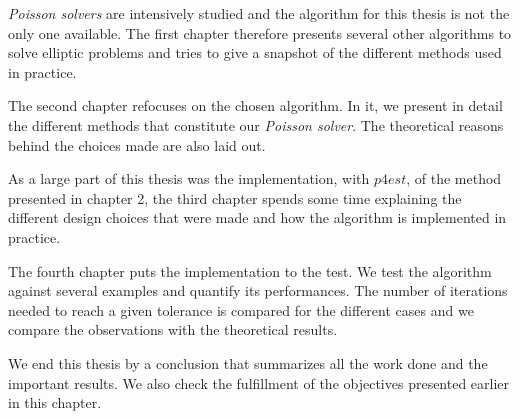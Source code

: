 \textit{Poisson solvers} are intensively studied and the algorithm for this thesis is not the only one available. The first chapter therefore presents several other algorithms to solve elliptic problems and tries to give a snapshot of the different methods used in practice. 

The second chapter refocuses on the chosen algorithm. In it, we present in detail the different methods that constitute our \textit{Poisson solver}. The theoretical reasons behind the choices made are also laid out.

As a large part of this thesis was the implementation, with $p4est$, of the method presented in chapter 2, the third chapter spends some time explaining the different design choices that were made and how the algorithm is implemented in practice. 

The fourth chapter puts the implementation to the test. We test the algorithm against several examples and quantify its performances. The number of iterations needed to reach a given tolerance is compared for the different cases and we compare the observations with the theoretical results. 

We end this thesis by a conclusion that summarizes all the work done and the important results. We also check the fulfillment of the objectives presented earlier in this chapter.


















